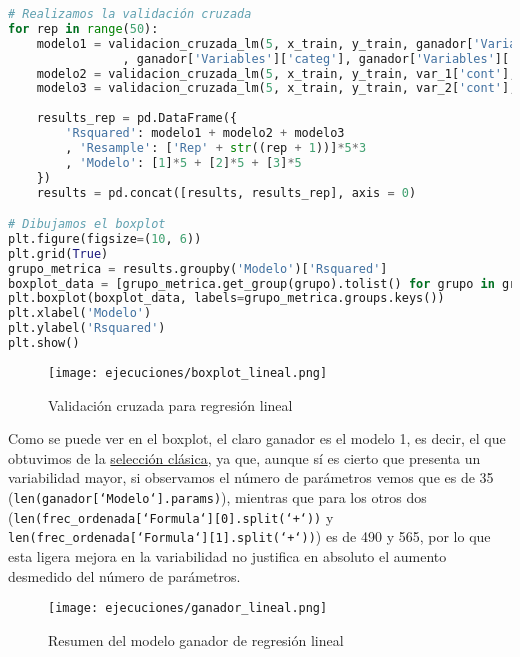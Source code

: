 \documentclass[a4paper,onecolumn]{extarticle}
\begin{document}
\begin{sloppypar}
\begin{lstlisting}[language=Python]
# Realizamos la validación cruzada
for rep in range(50):
    modelo1 = validacion_cruzada_lm(5, x_train, y_train, ganador['Variables']['cont']
                , ganador['Variables']['categ'], ganador['Variables']['inter'])
    modelo2 = validacion_cruzada_lm(5, x_train, y_train, var_1['cont'], var_1['categ'], var_1['inter'])
    modelo3 = validacion_cruzada_lm(5, x_train, y_train, var_2['cont'], var_2['categ'], var_2['inter'])
    
    results_rep = pd.DataFrame({
        'Rsquared': modelo1 + modelo2 + modelo3 
        , 'Resample': ['Rep' + str((rep + 1))]*5*3
        , 'Modelo': [1]*5 + [2]*5 + [3]*5 
    })
    results = pd.concat([results, results_rep], axis = 0)

# Dibujamos el boxplot
plt.figure(figsize=(10, 6))
plt.grid(True)
grupo_metrica = results.groupby('Modelo')['Rsquared']
boxplot_data = [grupo_metrica.get_group(grupo).tolist() for grupo in grupo_metrica.groups]
plt.boxplot(boxplot_data, labels=grupo_metrica.groups.keys()) 
plt.xlabel('Modelo')  
plt.ylabel('Rsquared') 
plt.show()  
\end{lstlisting}

\begin{center}
    \begin{figure}[h!]
        \centering
        \texttt{[image: ejecuciones/boxplot\_lineal.png]}
        \caption{Validación cruzada para regresión lineal}
        \label{fig:boxplotlin}
    \end{figure}
\end{center}

Como se puede ver en el boxplot, el claro ganador es el modelo 1, es decir, el que obtuvimos de la \hyperref[linclasica]{selección clásica}, ya que, aunque 
sí es cierto que presenta un variabilidad mayor, si observamos el número de parámetros vemos que es de 35 (\texttt{len(ganador[`Modelo`].params)}), mientras que
para los otros dos (\texttt{len(frec\_ordenada[`Formula`][0].split(`+`))} y \texttt{len(frec\_ordenada[`Formula`][1].split(`+`))}) es de 490 y 565, por lo que 
esta ligera mejora en la variabilidad no justifica en absoluto el aumento desmedido del número de parámetros.

\begin{center}
    \begin{figure}[h!]
        \centering
        \texttt{[image: ejecuciones/ganador\_lineal.png]}
        \caption{Resumen del modelo ganador de regresión lineal}
        \label{fig:summarylin}
    \end{figure}
\end{center}


\end{sloppypar}
\end{document}
